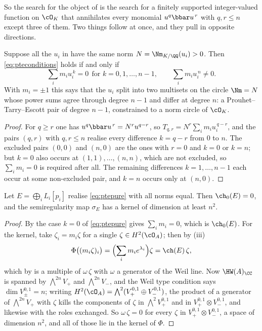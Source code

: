 So the search for the object of  is the search for a
finitely supported integer-valued function on $\cO_{K}$ that annihilates every
monomial $u^{q}\bbar u^{\,r}$ with $q,r\le n$ except three of them. Two things
follow at once, and they pull in opposite directions.

\begin{lemma}
\label{lem:pte}
Suppose all the $u_{i}$ in  have the same norm
$N=\Nm_{K/\QQ}(u_{i})>0$. Then \eqref{eq:pteconditions} holds if and only if
\begin{equation}\label{eq:ptepure}
  \sum_{i}m_{i}u_{i}^{\,k}=0\ \ \text{for } k=0,1,\dots,n-1,
  \qquad
  \sum_{i}m_{i}u_{i}^{\,n}\ne0 .
\end{equation}
With $m_{i}=\pm1$ this says that the $u_{i}$ split into two multisets on the
circle $\Nm=N$ whose power sums agree through degree $n-1$ and differ at
degree $n$: a Prouhet--Tarry--Escott pair of degree $n-1$, constrained to a
norm circle of $\cO_{K}$.
\end{lemma}

\begin{proof}
For $q\ge r$ one has $u^{q}\bbar u^{\,r}=N^{r}u^{q-r}$, so
$T_{q,r}=N^{r}\sum_{i}m_{i}u_{i}^{\,q-r}$, and the pairs $(q,r)$ with
$q,r\le n$ realise every difference $k=q-r$ from $0$ to $n$. The excluded
pairs $(0,0)$ and $(n,0)$ are the ones with $r=0$ and $k=0$ or $k=n$; but
$k=0$ also occurs at $(1,1),\dots,(n,n)$, which are not excluded, so
$\sum_{i}m_{i}=0$ is required after all. The remaining differences
$k=1,\dots,n-1$ each occur at some non-excluded pair, and $k=n$ occurs only at
$(n,0)$.
\end{proof}

\begin{theorem}\label{thm:equalnorms}
Let $E=\bigoplus_{i}L_{i}[p_{i}]$ realise \eqref{eq:ptepure} with all norms
equal. Then $\ch_{0}(E)=0$, and the semiregularity map $\sigma_{E}$ has a
kernel of dimension at least $n^{2}$.
\end{theorem}

\begin{proof}
By  the case $k=0$ of \eqref{eq:ptepure} gives
$\sum_{i}m_{i}=0$, which is $\ch_{0}(E)$. For the kernel, take
$\zeta_{i}=m_{i}\zeta$ for a single $\zeta\in H^{2}(\cO_{A})$; then by
(iii)
\[
  \Phi\bigl((m_{i}\zeta)_{i}\bigr)
  =\Bigl(\sum_{i}m_{i}e^{\lambda_{i}}\Bigr)\zeta=\ch(E)\,\zeta ,
\]
which by  is a multiple of $\omega\,\zeta$ with
$\omega$ a generator of the Weil line. Now $\HW(A)_{\CC}$ is spanned by
$\bigwedge^{2n}V_{+}$ and $\bigwedge^{2n}V_{-}$, and the Weil type condition
says $\dim V_{\pm}^{0,1}=n$; writing
$H^{2}(\cO_{A})=\bigwedge^{2}(V_{+}^{0,1}\oplus V_{-}^{0,1})$, the product of
a generator of $\bigwedge^{2n}V_{+}$ with $\zeta$ kills the components of
$\zeta$ in $\bigwedge^{2}V_{+}^{0,1}$ and in
$V_{+}^{0,1}\otimes V_{-}^{0,1}$, and likewise with the roles exchanged. So
$\omega\,\zeta=0$ for every $\zeta$ in
$V_{+}^{0,1}\otimes V_{-}^{0,1}$, a space of dimension $n^{2}$, and all of
those lie in the kernel of $\Phi$.
\end{proof}

